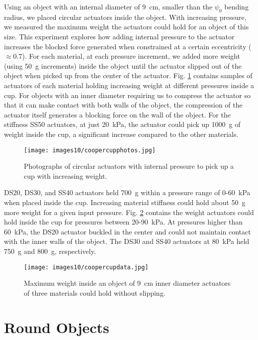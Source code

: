 Using an object with an internal diameter of 9~cm, smaller than the $\psi_0$ bending radius, we placed circular actuators inside the object. With increasing pressure, we measured the maximum weight the actuators could hold for an object of this size. This experiment explores how adding internal pressure to the actuator increases the blocked force generated when constrained at a certain eccentricity ( $\approx0.7$). For each material, at each pressure increment, we added more weight (using 50~g increments) inside the object until the actuator slipped out of the object when picked up from the center of the actuator. Fig. \ref{fig:coopercupphotos} contains samples of actuators of each material holding increasing weight at different pressures inside a cup. For objects with an inner diameter requiring us to compress the actuator so that it can make contact with both walls of the object, the compression of the actuator itself generates a blocking force on the wall of the object. For the stiffness SS50 actuators, at just 20~kPa, the actuator could pick up 1000~g of weight inside the cup, a significant increase compared to the other materials. 
\\
\begin{figure}[!ht]
    \centering
     \texttt{[image: images10/coopercupphotos.jpg]}
    \caption{Photographs of circular actuators with internal pressure to pick up a cup with increasing weight.}
    \label{fig:coopercupphotos}
\end{figure}

DS20, DS30, and SS40 actuators held 700~g within a pressure range of 0-60~kPa when placed inside the cup. Increasing material stiffness could hold about 50~g more weight for a given input pressure. Fig. \ref{fig:coopercupdata} contains the weight actuators could hold inside the cup for pressures between 20-90~kPa. At pressures higher than 60~kPa, the DS20 actuator buckled in the center and could not maintain contact with the inner walls of the object. The DS30 and SS40 actuators at 80~kPa held 750~g and 800~g, respectively. \\ 

\begin{figure}[!ht]
    \centering
     \texttt{[image: images10/coopercupdata.jpg]}
    \caption{Maximum weight inside an object of 9~cm inner diameter actuators of three materials could hold without slipping.}
    \label{fig:coopercupdata}
\end{figure}

\clearpage
\section{Round Objects}

